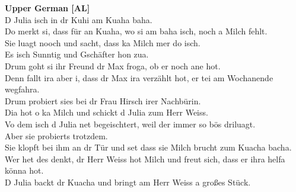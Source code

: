 \documentclass[output=paper]{LSP/langsci}
\begin{document}
{\noindent\textbf{Upper German [AL]}\\
D Julia isch in dr Kuhi am Kuaha baha.\\
Do merkt si, dass f\"ur an Kuaha, wo si am baha isch, noch a Milch fehlt.\\
Sie luagt nooch und sacht, dass ka Milch mer do isch.\\
Es isch Sunntig und Gsch\"after hon zua.\\
Drum goht si ihr Freund dr Max froga, ob er noch ane hot.\\
Denn fallt ira aber i, dass dr Max ira verz\"ahlt hot, er tei am Wochanende wegfahra.\\
Drum probiert sies bei dr Frau Hirsch irer Nachb\"urin.\\
Dia hot o ka Milch und schickt d Julia zum Herr Weiss.\\
Vo dem isch d Julia net begeischtert, weil der immer so b\"os driluagt.\\
Aber sie probierts trotzdem.\\
Sie klopft bei ihm an dr T\"ur und set dass sie Milch brucht zum Kuacha bacha.\\
Wer het des denkt, dr Herr Weiss hot Milch und freut sich, dass er ihra helfa k\"onna hot.\\
D Julia backt dr Kuacha und bringt am Herr Weiss a großes St\"uck.\\
}

\printbibliography[heading=subbibliography,notkeyword=this]
\end{document}

